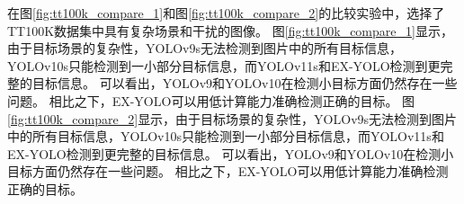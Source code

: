 在图\ref{fig:tt100k_compare_1}和图\ref{fig:tt100k_compare_2}的比较实验中，选择了TT100K数据集中具有复杂场景和干扰的图像。
图\ref{fig:tt100k_compare_1}显示，由于目标场景的复杂性，YOLOv9s无法检测到图片中的所有目标信息，YOLOv10s只能检测到一小部分目标信息，而YOLOv11s和EX-YOLO检测到更完整的目标信息。 可以看出，YOLOv9和YOLOv10在检测小目标方面仍然存在一些问题。 相比之下，EX-YOLO可以用低计算能力准确检测正确的目标。
图\ref{fig:tt100k_compare_2}显示，由于目标场景的复杂性，YOLOv9s无法检测到图片中的所有目标信息，YOLOv10s只能检测到一小部分目标信息，而YOLOv11s和EX-YOLO检测到更完整的目标信息。 可以看出，YOLOv9和YOLOv10在检测小目标方面仍然存在一些问题。 相比之下，EX-YOLO可以用低计算能力准确检测正确的目标。

\begin{figure}[htbp]
    \centering
        \\
    \captionsetup{font=footnotesize}
    \label{fig:vd_compare_1}
\end{figure}

